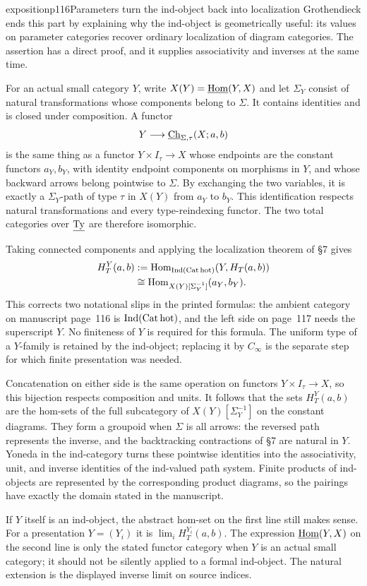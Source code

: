 \begin{dcomment}{exposition}{p116}{Parameters turn the ind-object back into localization}
Grothendieck ends this part by explaining why the ind-object is geometrically useful: its values on parameter categories recover ordinary localization of diagram categories. The assertion has a direct proof, and it supplies associativity and inverses at the same time.

For an actual small category $Y$, write $X(Y)=\underline{\mathrm{Hom}}(Y,X)$ and let $\Sigma_Y$ consist of natural transformations whose components belong to $\Sigma$. It contains identities and is closed under composition. A functor
\[
 Y\longrightarrow\underline{\mathrm{Ch}}_{\Sigma,\tau}(X;a,b)
\]
is the same thing as a functor $Y\times I_\tau\to X$ whose endpoints are the constant functors $a_Y,b_Y$, with identity endpoint components on morphisms in $Y$, and whose backward arrows belong pointwise to $\Sigma$. By exchanging the two variables, it is exactly a $\Sigma_Y$-path of type $\tau$ in $X(Y)$ from $a_Y$ to $b_Y$. This identification respects natural transformations and every type-reindexing functor. The two total categories over $\underline{\mathrm{Ty}}$ are therefore isomorphic.

Taking connected components and applying the localization theorem of \S7 gives
\[
 \begin{split}
 H_T^Y(a,b)
 &:=\mathrm{Hom}_{\operatorname{Ind}(\mathrm{Cat\,hot})}(Y,H_T(a,b))\\
 &\cong\mathrm{Hom}_{X(Y)[\Sigma_Y^{-1}]}(a_Y,b_Y).
 \end{split}
\]
This corrects two notational slips in the printed formulas: the ambient category on manuscript page~116 is $\operatorname{Ind}(\mathrm{Cat\,hot})$, and the left side on page~117 needs the superscript $Y$. No finiteness of $Y$ is required for this formula. The uniform type of a $Y$-family is retained by the ind-object; replacing it by $C_\infty$ is the separate step for which finite presentation was needed.

Concatenation on either side is the same operation on functors $Y\times I_\tau\to X$, so this bijection respects composition and units. It follows that the sets $H_T^Y(a,b)$ are the hom-sets of the full subcategory of $X(Y)[\Sigma_Y^{-1}]$ on the constant diagrams. They form a groupoid when $\Sigma$ is all arrows: the reversed path represents the inverse, and the backtracking contractions of \S7 are natural in $Y$. Yoneda in the ind-category turns these pointwise identities into the associativity, unit, and inverse identities of the ind-valued path system. Finite products of ind-objects are represented by the corresponding product diagrams, so the pairings have exactly the domain stated in the manuscript.

If $Y$ itself is an ind-object, the abstract hom-set on the first line still makes sense. For a presentation $Y=(Y_i)$ it is $\lim_i H_T^{Y_i}(a,b)$. The expression $\underline{\mathrm{Hom}}(Y,X)$ on the second line is only the stated functor category when $Y$ is an actual small category; it should not be silently applied to a formal ind-object. The natural extension is the displayed inverse limit on source indices.
\end{dcomment}


